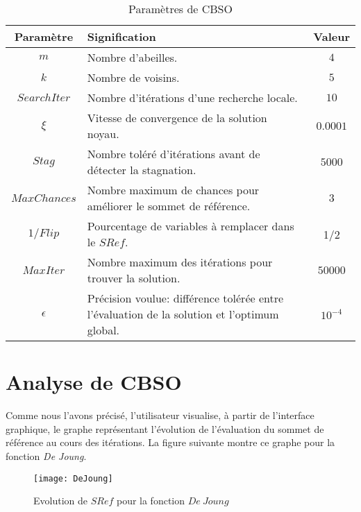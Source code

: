 \begin{table}[H]\centering
	\begin{tabular}{cp{}c}
		\toprule \textbf{Paramètre} & \textbf{Signification} & \textbf{Valeur}  \\    \midrule
		$m$ & Nombre d'abeilles. & $4$   \\   
		$k$ & Nombre de voisins. & $5$  \\   
		$SearchIter$ & Nombre d'itérations d'une recherche locale. & $10$ \\   
		$\xi$ & Vitesse de convergence de la solution noyau. & $0.0001$  \\     \addlinespace 
		$Stag$ & Nombre toléré d'itérations avant de détecter la stagnation. & $5000$ \\ \addlinespace 
		$MaxChances$ & Nombre maximum de chances pour améliorer le sommet de référence. & $3$   \\ \addlinespace 
		$1/Flip$ & Pourcentage de variables à remplacer dans le $SRef$. & 1/2   \\ \addlinespace 
		$MaxIter$ & Nombre maximum des itérations pour trouver la solution. & $50000$  \\ \addlinespace 
		$\epsilon$ & Précision voulue: différence tolérée entre l'évaluation de la solution et l'optimum global. & $10^{-4}$   \\		
		\bottomrule	
	\end{tabular}
	\caption{Paramètres de CBSO\label{key}}
\end{table}

\vspace{-1.2em}

\section{Analyse de CBSO}

\vspace{-0.5em}

Comme nous l'avons précisé, l'utilisateur visualise, à partir de l'interface graphique, le graphe représentant l'évolution de l'évaluation du sommet de référence au cours des itérations. La figure suivante montre ce graphe pour la fonction \emph{De Joung}.\bigskip

\begin{figure}[H]
	\centering
	\texttt{[image: DeJoung]}
	\caption{Evolution de $SRef$ pour la fonction $De~Joung$}
\end{figure}

